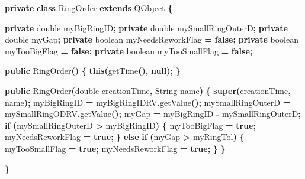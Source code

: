 \documentclass[
]{book}
\newenvironment{Shaded}{\begin{snugshade}}{\end{snugshade}}
\newcommand{\BuiltInTok}[1]{#1}
\newcommand{\ControlFlowTok}[1]{\textcolor[rgb]{0.13,0.29,0.53}{\textbf{#1}}}
\newcommand{\DataTypeTok}[1]{\textcolor[rgb]{0.13,0.29,0.53}{#1}}
\newcommand{\FunctionTok}[1]{\textcolor[rgb]{0.00,0.00,0.00}{#1}}
\newcommand{\KeywordTok}[1]{\textcolor[rgb]{0.13,0.29,0.53}{\textbf{#1}}}
\newcommand{\NormalTok}[1]{#1}
\newcommand{\OperatorTok}[1]{\textcolor[rgb]{0.81,0.36,0.00}{\textbf{#1}}}
\theoremstyle{definition}
\theoremstyle{definition}
\theoremstyle{definition}
\theoremstyle{definition}
\theoremstyle{remark}
\begin{document}
\begin{Shaded}
\begin{Highlighting}[]
\KeywordTok{private} \KeywordTok{class}\NormalTok{ RingOrder }\KeywordTok{extends}\NormalTok{ QObject }\OperatorTok{\{}

    \KeywordTok{private} \DataTypeTok{double}\NormalTok{ myBigRingID}\OperatorTok{;}
    \KeywordTok{private} \DataTypeTok{double}\NormalTok{ mySmallRingOuterD}\OperatorTok{;}
    \KeywordTok{private} \DataTypeTok{double}\NormalTok{ myGap}\OperatorTok{;}
    \KeywordTok{private} \DataTypeTok{boolean}\NormalTok{ myNeedsReworkFlag }\OperatorTok{=} \KeywordTok{false}\OperatorTok{;}
    \KeywordTok{private} \DataTypeTok{boolean}\NormalTok{ myTooBigFlag }\OperatorTok{=} \KeywordTok{false}\OperatorTok{;}
    \KeywordTok{private} \DataTypeTok{boolean}\NormalTok{ myTooSmallFlag }\OperatorTok{=} \KeywordTok{false}\OperatorTok{;}

    \KeywordTok{public} \FunctionTok{RingOrder}\OperatorTok{()} \OperatorTok{\{}
        \KeywordTok{this}\OperatorTok{(}\FunctionTok{getTime}\OperatorTok{(),} \KeywordTok{null}\OperatorTok{);}
    \OperatorTok{\}}

    \KeywordTok{public} \FunctionTok{RingOrder}\OperatorTok{(}\DataTypeTok{double}\NormalTok{ creationTime}\OperatorTok{,} \BuiltInTok{String}\NormalTok{ name}\OperatorTok{)} \OperatorTok{\{}
        \KeywordTok{super}\OperatorTok{(}\NormalTok{creationTime}\OperatorTok{,}\NormalTok{ name}\OperatorTok{);}
\NormalTok{        myBigRingID }\OperatorTok{=}\NormalTok{ myBigRingIDRV}\OperatorTok{.}\FunctionTok{getValue}\OperatorTok{();}
\NormalTok{        mySmallRingOuterD }\OperatorTok{=}\NormalTok{ mySmallRingODRV}\OperatorTok{.}\FunctionTok{getValue}\OperatorTok{();}
\NormalTok{        myGap }\OperatorTok{=}\NormalTok{ myBigRingID }\OperatorTok{{-}}\NormalTok{ mySmallRingOuterD}\OperatorTok{;}
        \ControlFlowTok{if} \OperatorTok{(}\NormalTok{mySmallRingOuterD }\OperatorTok{\textgreater{}}\NormalTok{ myBigRingID}\OperatorTok{)} \OperatorTok{\{}
\NormalTok{            myTooBigFlag }\OperatorTok{=} \KeywordTok{true}\OperatorTok{;}
\NormalTok{            myNeedsReworkFlag }\OperatorTok{=} \KeywordTok{true}\OperatorTok{;}
        \OperatorTok{\}} \ControlFlowTok{else} \ControlFlowTok{if} \OperatorTok{(}\NormalTok{myGap }\OperatorTok{\textgreater{}}\NormalTok{ myRingTol}\OperatorTok{)} \OperatorTok{\{}
\NormalTok{            myTooSmallFlag }\OperatorTok{=} \KeywordTok{true}\OperatorTok{;}
\NormalTok{            myNeedsReworkFlag }\OperatorTok{=} \KeywordTok{true}\OperatorTok{;}
        \OperatorTok{\}}
    \OperatorTok{\}}

\OperatorTok{\}}
\end{Highlighting}
\end{Shaded}
\end{document}
